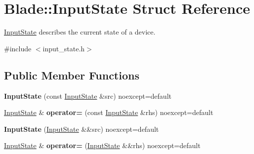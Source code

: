\hypertarget{struct_blade_1_1_input_state}{}\section{Blade\+:\+:Input\+State Struct Reference}
\label{struct_blade_1_1_input_state}


\hyperlink{struct_blade_1_1_input_state}{Input\+State} describes the current state of a device.  




{\ttfamily \#include $<$input\+\_\+state.\+h$>$}

\subsection*{Public Member Functions}
\begin{DoxyCompactItemize}
\item 
\mbox{\label{struct_blade_1_1_input_state_a7761b5ee2008116d690acec154b287f3}} 
{\bfseries Input\+State} (const \hyperlink{struct_blade_1_1_input_state}{Input\+State} \&src) noexcept=default
\item 
\mbox{\label{struct_blade_1_1_input_state_a5422cf146a8983a5d819ecc31f102522}} 
\hyperlink{struct_blade_1_1_input_state}{Input\+State} \& {\bfseries operator=} (const \hyperlink{struct_blade_1_1_input_state}{Input\+State} \&rhs) noexcept=default
\item 
\mbox{\label{struct_blade_1_1_input_state_acc4172340360db7f2f9b5530196638c2}} 
{\bfseries Input\+State} (\hyperlink{struct_blade_1_1_input_state}{Input\+State} \&\&src) noexcept=default
\item 
\mbox{\label{struct_blade_1_1_input_state_a9a429a9e4359993167e91e2c49fce3a7}} 
\hyperlink{struct_blade_1_1_input_state}{Input\+State} \& {\bfseries operator=} (\hyperlink{struct_blade_1_1_input_state}{Input\+State} \&\&rhs) noexcept=default
\end{DoxyCompactItemize}
